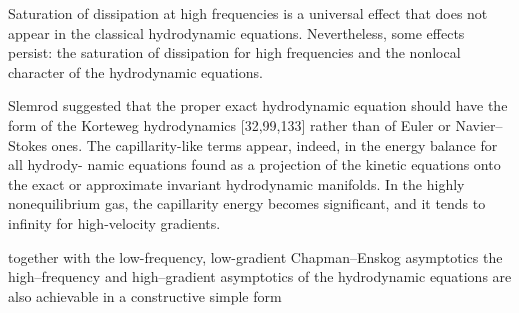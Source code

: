 Saturation of dissipation at high frequencies is a universal effect that does not appear in the classical hydrodynamic equations.
Nevertheless, some effects persist: the saturation of dissipation for high frequencies and the nonlocal character of the hydrodynamic equations.

Slemrod suggested that the proper exact hydrodynamic equation should have the form of the Korteweg hydrodynamics [32,99,133] rather than of Euler or Navier–Stokes ones.
The capillarity-like terms appear, indeed, in the energy balance for all hydrody- namic equations found as a projection of the kinetic equations onto the exact or approximate invariant hydrodynamic manifolds.
In the highly nonequilibrium gas, the capillarity energy becomes significant, and it tends to infinity for high-velocity gradients.

together with the low-frequency, low-gradient Chapman–Enskog asymptotics the high–frequency and high–gradient asymptotics of the hydrodynamic equations are also achievable in a constructive simple form



